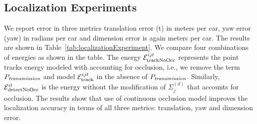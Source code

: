\subsection{Localization Experiments}
We report error in three metrics translation error (t) in meters per car, yaw
error (yaw) in radians per car and dimension error is again meters per car. The
results are shown in Table~\ref{tab:localizationExperiment}.  We compare four
combinations of energies as shown in the table.  The energy $\mathcal{E}^{ijt}_{\text{trackNoOcc}}$
represents the point tracks energy modeled with accounting for occlusion, i.e.,
we remove the term $P_{\textit{transmission}}$ and model $\mathcal{E}^{ijt}_{\text{track}}$ in the absence of
$P_{\textit{transmission}}$. Similarly, $\mathcal{E}^{it}_{\text{detectNoOcc}}$ is the energy without the
modification of $\Sigma^{(d)}_j$ that accounts for occlusion.  The results show that
use of continuous occlusion model improves the localization accuracy in terms
of all three metrics: translation, yaw and dimension error.

